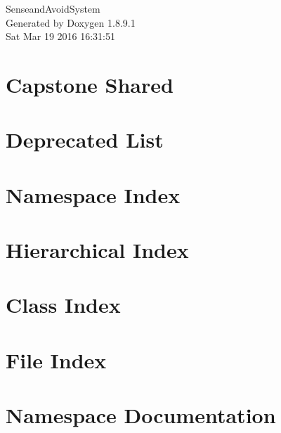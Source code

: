 \documentclass[twoside]{book}
\newcommand{\+}{\discretionary{\mbox{\scriptsize$\hookleftarrow$}}{}{}}
\newcommand{\clearemptydoublepage}{%
  \newpage{\pagestyle{empty}\cleardoublepage}%
}
\begin{document}
\hypersetup{pageanchor=false,
             bookmarks=true,
             bookmarksnumbered=true,
             pdfencoding=unicode
            }
\begin{titlepage}
\vspace*{7cm}
\begin{center}%
{\Large Senseand\+Avoid\+System }\\
\vspace*{1cm}
{\large Generated by Doxygen 1.8.9.1}\\
\vspace*{0.5cm}
{\small Sat Mar 19 2016 16:31:51}\\
\end{center}
\end{titlepage}
\clearemptydoublepage
\tableofcontents
\clearemptydoublepage
{}
\hypersetup{pageanchor=true}

\chapter{Capstone Shared}
\label{md__home_fpoole_development_cpe406_saas_lib_gp_capstone-shared__r_e_a_d_m_e}
\hypertarget{md__home_fpoole_development_cpe406_saas_lib_gp_capstone-shared__r_e_a_d_m_e}{}

\chapter{Deprecated List}
\label{deprecated}
\hypertarget{deprecated}{}

\chapter{Namespace Index}

\chapter{Hierarchical Index}

\chapter{Class Index}

\chapter{File Index}

\chapter{Namespace Documentation}







\end{document}
